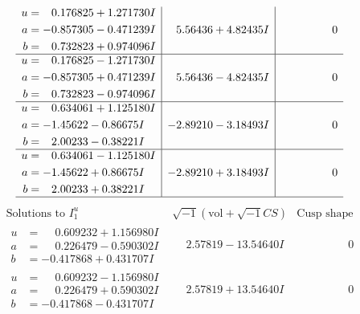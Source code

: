 \documentclass[1p]{elsarticle_modified}
\theoremstyle{definition}
\newcommand{\I}{\sqrt{-1}}
\begin{document}
$$\begin{array}{c|c|c}
\begin{aligned}
u &= \phantom{-}0.176825 + 1.271730 I \\
a &= -0.857305 - 0.471239 I \\
b &= \phantom{-}0.732823 + 0.974096 I\end{aligned}
 & \phantom{-}5.56436 + 4.82435 I & \phantom{-0.000000 } 0 \\ \hline\begin{aligned}
u &= \phantom{-}0.176825 - 1.271730 I \\
a &= -0.857305 + 0.471239 I \\
b &= \phantom{-}0.732823 - 0.974096 I\end{aligned}
 & \phantom{-}5.56436 - 4.82435 I & \phantom{-0.000000 } 0 \\ \hline\begin{aligned}
u &= \phantom{-}0.634061 + 1.125180 I \\
a &= -1.45622 - 0.86675 I \\
b &= \phantom{-}2.00233 - 0.38221 I\end{aligned}
 & -2.89210 - 3.18493 I & \phantom{-0.000000 } 0 \\ \hline\begin{aligned}
u &= \phantom{-}0.634061 - 1.125180 I \\
a &= -1.45622 + 0.86675 I \\
b &= \phantom{-}2.00233 + 0.38221 I\end{aligned}
 & -2.89210 + 3.18493 I & \phantom{-0.000000 } 0\\
 \hline 
 \end{array}$$\newpage$$\begin{array}{c|c|c}  
\text{Solutions to }I^u_{1}& \I (\text{vol} + \sqrt{-1}CS) & \text{Cusp shape}\\
 \hline 
\begin{aligned}
u &= \phantom{-}0.609232 + 1.156980 I \\
a &= \phantom{-}0.226479 - 0.590302 I \\
b &= -0.417868 + 0.431707 I\end{aligned}
 & \phantom{-}2.57819 - 13.54640 I & \phantom{-0.000000 } 0 \\ \hline\begin{aligned}
u &= \phantom{-}0.609232 - 1.156980 I \\
a &= \phantom{-}0.226479 + 0.590302 I \\
b &= -0.417868 - 0.431707 I\end{aligned}
 & \phantom{-}2.57819 + 13.54640 I & \phantom{-0.000000 } 0 \\ \hline\begin{aligned}

\end{aligned}
\end{array}$$
\end{document}
